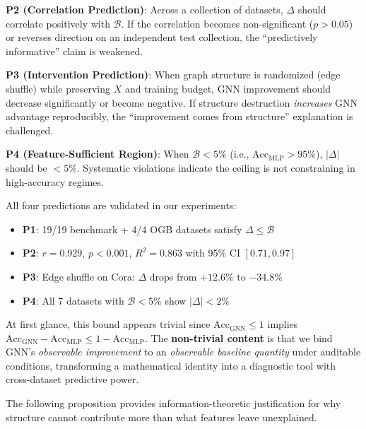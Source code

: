 \textbf{P2 (Correlation Prediction)}: Across a collection of datasets, $\Delta$ should correlate positively with $\mathcal{B}$. If the correlation becomes non-significant ($p > 0.05$) or reverses direction on an independent test collection, the ``predictively informative'' claim is weakened.

\textbf{P3 (Intervention Prediction)}: When graph structure is randomized (edge shuffle) while preserving $X$ and training budget, GNN improvement should decrease significantly or become negative. If structure destruction \textit{increases} GNN advantage reproducibly, the ``improvement comes from structure'' explanation is challenged.

\textbf{P4 (Feature-Sufficient Region)}: When $\mathcal{B} < 5\%$ (i.e., $\text{Acc}_{\text{MLP}} > 95\%$), $|\Delta|$ should be $< 5\%$. Systematic violations indicate the ceiling is not constraining in high-accuracy regimes.

\begin{observation}
\label{obs:budget_principle}
All four predictions are validated in our experiments:
\begin{itemize}
    \item \textbf{P1}: 19/19 benchmark + 4/4 OGB datasets satisfy $\Delta \leq \mathcal{B}$
    \item \textbf{P2}: $r = 0.929$, $p < 0.001$, $R^2 = 0.863$ with 95\% CI $[0.71, 0.97]$
    \item \textbf{P3}: Edge shuffle on Cora: $\Delta$ drops from $+12.6\%$ to $-34.8\%$
    \item \textbf{P4}: All 7 datasets with $\mathcal{B} < 5\%$ show $|\Delta| < 2\%$
\end{itemize}
\end{observation}

\begin{remark}
\label{rem:triviality}
At first glance, this bound appears trivial since $\text{Acc}_{\text{GNN}} \leq 1$ implies $\text{Acc}_{\text{GNN}} - \text{Acc}_{\text{MLP}} \leq 1 - \text{Acc}_{\text{MLP}}$. The \textbf{non-trivial content} is that we bind GNN's \textit{observable improvement} to an \textit{observable baseline quantity} under auditable conditions, transforming a mathematical identity into a diagnostic tool with cross-dataset predictive power.
\end{remark}

The following proposition provides information-theoretic justification for why structure cannot contribute more than what features leave unexplained.

